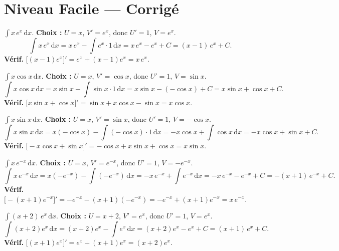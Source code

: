 \documentclass[11pt,a4paper]{article}
\newcommand{\dd}{\mathrm{d}}
\begin{document}
\section*{Niveau Facile — Corrigé}

\begin{corr}[1]
$\displaystyle\int x\,e^x\,\dd x$. \textbf{Choix :} $U=x$, $V'=e^x$, donc $U'=1$, $V=e^x$.
\[
\int x\,e^x\,\dd x=x\,e^x-\int e^x\cdot 1\,\dd x=x\,e^x-e^x+C=\boxed{(x-1)\,e^x+C.}
\]
\textbf{Vérif.} $\bigl[(x-1)e^x\bigr]'=e^x+(x-1)e^x=x\,e^x$. \checkmark
\end{corr}

\begin{corr}[2]
$\displaystyle\int x\cos x\,\dd x$. \textbf{Choix :} $U=x$, $V'=\cos x$, donc $U'=1$, $V=\sin x$.
\[
\int x\cos x\,\dd x=x\sin x-\int \sin x\cdot 1\,\dd x=x\sin x-(-\cos x)+C=\boxed{x\sin x+\cos x+C.}
\]
\textbf{Vérif.} $\bigl[x\sin x+\cos x\bigr]'=\sin x+x\cos x-\sin x=x\cos x$. \checkmark
\end{corr}

\begin{corr}[3]
$\displaystyle\int x\sin x\,\dd x$. \textbf{Choix :} $U=x$, $V'=\sin x$, donc $U'=1$, $V=-\cos x$.
\[
\int x\sin x\,\dd x=x(-\cos x)-\int(-\cos x)\cdot 1\,\dd x=-x\cos x+\int\cos x\,\dd x=\boxed{-x\cos x+\sin x+C.}
\]
\textbf{Vérif.} $\bigl[-x\cos x+\sin x\bigr]'=-\cos x+x\sin x+\cos x=x\sin x$. \checkmark
\end{corr}

\begin{corr}[4]
$\displaystyle\int x\,e^{-x}\,\dd x$. \textbf{Choix :} $U=x$, $V'=e^{-x}$, donc $U'=1$, $V=-e^{-x}$.
\[
\int x\,e^{-x}\,\dd x=x(-e^{-x})-\int(-e^{-x})\,\dd x=-x\,e^{-x}+\int e^{-x}\,\dd x=-x\,e^{-x}-e^{-x}+C=\boxed{-(x+1)\,e^{-x}+C.}
\]
\textbf{Vérif.} $\bigl[-(x+1)e^{-x}\bigr]'=-e^{-x}-(x+1)(-e^{-x})=-e^{-x}+(x+1)e^{-x}=x\,e^{-x}$. \checkmark
\end{corr}

\begin{corr}[5]
$\displaystyle\int (x+2)\,e^{x}\,\dd x$. \textbf{Choix :} $U=x+2$, $V'=e^x$, donc $U'=1$, $V=e^x$.
\[
\int (x+2)e^x\,\dd x=(x+2)e^x-\int e^x\,\dd x=(x+2)e^x-e^x+C=\boxed{(x+1)\,e^{x}+C.}
\]
\textbf{Vérif.} $\bigl[(x+1)e^x\bigr]'=e^x+(x+1)e^x=(x+2)e^x$. \checkmark
\end{corr}
\end{document}
